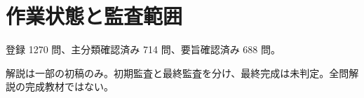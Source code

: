 \chapter{作業状態と監査範囲}
登録 1270 問、主分類確認済み 714 問、要旨確認済み 688 問。
\par 解説は一部の初稿のみ。初期監査と最終監査を分け、最終完成は未判定。全問解説の完成教材ではない。
